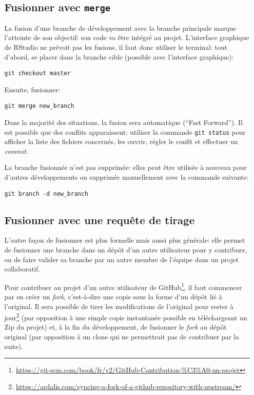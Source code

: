 \documentclass[
  12pt,
  french,
  a4paper,
  extrafontsizes,onecolumn,openright
  ]{memoir}
\newlength{\rf}
\begin{document}
\subsection{\texorpdfstring{Fusionner avec \texttt{merge}}{Fusionner avec merge}}\label{fusionner-avec-merge}

La fusion d'une branche de développement avec la branche principale marque l'atteinte de son objectif: son code va être intégré au projet.
L'interface graphique de RStudio ne prévoit pas les fusions, il faut donc utiliser le terminal: tout d'abord, se placer dans la branche cible (possible avec l'interface graphique):

\begin{verbatim}
git checkout master
\end{verbatim}

Ensuite, fusionner:

\begin{verbatim}
git merge new_branch
\end{verbatim}

Dans la majorité des situations, la fusion sera automatique (\enquote{Fast Forward}).
Il est possible que des conflits apparaissent: utiliser la commande \texttt{git\ status} pour afficher la liste des fichiers concernés, les ouvrir, régler le confit et effectuer un \emph{commit}.

La branche fusionnée n'est pas supprimée: elles peut être utilisée à nouveau pour d'autres développements ou supprimée manuellement avec la commande suivante:

\begin{verbatim}
git branch -d new_branch
\end{verbatim}

\subsection{Fusionner avec une requête de tirage}\label{fusionner-avec-une-requuxeate-de-tirage}

L'autre façon de fusionner est plus formelle mais aussi plus générale: elle permet de fusionner une branche dans un dépôt d'un autre utilisateur pour y contribuer, ou de faire valider sa branche par un autre membre de l'équipe dans un projet collaboratif.

Pour contribuer au projet d'un autre utilisateur de GitHub\footnote{\url{https://git-scm.com/book/fr/v2/GitHub-Contribution-\%C3\%A0-un-projet}}, il faut commencer par en créer un \emph{fork}, c'est-à-dire une copie sous la forme d'un dépôt lié à l'original.
Il sera possible de tirer les modifications de l'original pour rester à jour\footnote{\url{https://ardalis.com/syncing-a-fork-of-a-github-repository-with-upstream/}} (par opposition à une simple copie instantanée possible en téléchargeant un Zip du projet) et, à la fin du développement, de fusionner le \emph{fork} au dépôt original (par opposition à un clone qui ne permettrait pas de contribuer par la suite).
\end{document}
